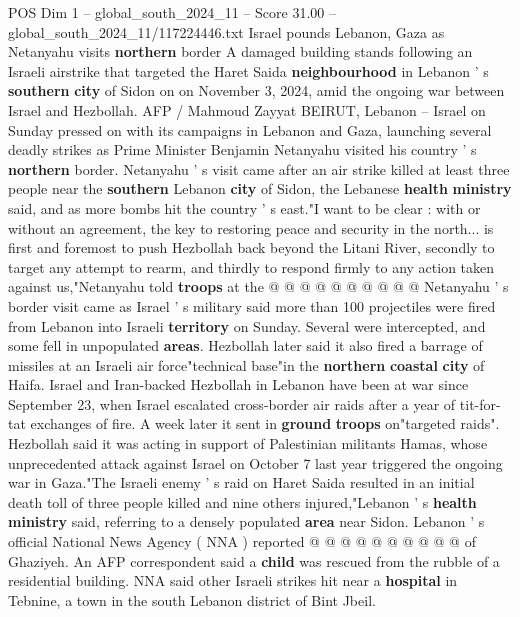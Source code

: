 \begin{textsample}{POS Dim 1 – global\_south\_2024\_11 – Score 31.00 – global\_south\_2024\_11/117224446.txt}  \label{ex:f1_pos_246}
Israel pounds Lebanon, Gaza as Netanyahu visits \textbf{northern} border A damaged building stands following an Israeli airstrike that targeted the Haret Saida \textbf{neighbourhood} in Lebanon ' s \textbf{southern} \textbf{city} of Sidon on on November 3, 2024, amid the ongoing war between Israel and Hezbollah.
AFP / Mahmoud Zayyat BEIRUT, Lebanon -- Israel on Sunday pressed on with its campaigns in Lebanon and Gaza, launching several deadly strikes as Prime Minister Benjamin Netanyahu visited his country ' s \textbf{northern} border.
Netanyahu ' s visit came after an air strike killed at least three people near the \textbf{southern} Lebanon \textbf{city} of Sidon, the Lebanese \textbf{health} \textbf{ministry} said, and as more bombs hit the country ' s east."I want to be clear : with or without an agreement, the key to restoring peace and security in the north... is first and foremost to push Hezbollah back beyond the Litani River, secondly to target any attempt to rearm, and thirdly to respond firmly to any action taken against us,"Netanyahu told \textbf{troops} at the @ @ @ @ @ @ @ @ @ @ Netanyahu ' s border visit came as Israel ' s military said more than 100 projectiles were fired from Lebanon into Israeli \textbf{territory} on Sunday.
Several were intercepted, and some fell in unpopulated \textbf{areas}.
Hezbollah later said it also fired a barrage of missiles at an Israeli air force"technical base"in the \textbf{northern} \textbf{coastal} \textbf{city} of Haifa.
Israel and Iran-backed Hezbollah in Lebanon have been at war since September 23, when Israel escalated cross-border air raids after a year of tit-for-tat exchanges of fire.
A week later it sent in \textbf{ground} \textbf{troops} on"targeted raids".
Hezbollah said it was acting in support of Palestinian militants Hamas, whose unprecedented attack against Israel on October 7 last year triggered the ongoing war in Gaza."The Israeli enemy ' s raid on Haret Saida resulted in an initial death toll of three people killed and nine others injured,"Lebanon ' s \textbf{health} \textbf{ministry} said, referring to a densely populated \textbf{area} near Sidon.
Lebanon ' s official National News Agency ( NNA ) reported @ @ @ @ @ @ @ @ @ @ of Ghaziyeh.
An AFP correspondent said a \textbf{child} was rescued from the rubble of a residential building.
NNA said other Israeli strikes hit near a \textbf{hospital} in Tebnine, a town in the south Lebanon district of Bint Jbeil.

\end{textsample}
